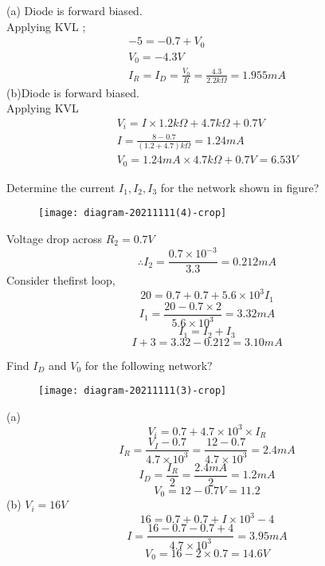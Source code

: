 \begin{enumerate}[label=\color{futuringtheme}\textbf{\arabic*.}]
\begin{minipage}{\textwidth}
\begin{figure}[H]
		\end{figure}
	\end{minipage}
	\begin{answer}
		(a) Diode is forward biased.\\
		Applying KVL ;\\
		\begin{align*}
		-5=-0.7+V_0\\
		V_0=-4.3V\\
		I_R=I_D=\frac{V_0}{R}=\frac{4.3}{2.2k\Omega}=1.955mA
		\end{align*}
		(b)Diode is forward biased.\\
		Applying KVL
		\begin{align*}
		V_i=I\times 1.2k\Omega +4.7k \Omega+0.7V\\
		I=\frac{8-0.7}{(1.2+4.7)k\Omega}=1.24mA\\
		V_0=1.24mA\times 4.7k\Omega+0.7V=6.53V
		\end{align*}
	\end{answer}
	\begin{minipage}{\textwidth}
		\item Determine the current $I_1,I_2,I_3$ for the network shown in figure?
		\begin{figure}[H]
			\centering
			\texttt{[image: diagram-20211111(4)-crop]}
			\caption{}
			\label{}
		\end{figure}
	\end{minipage}
	\begin{answer}
		Voltage drop across $R_2=0.7V$ \\
		$$\therefore I_2=\frac{0.7\times 10^{-3}}{3.3}=0.212mA$$
		Consider thefirst loop,\\
		$$20=0.7+0.7+5.6\times 10^{3}I_1$$
		$$I_1=\frac{20-0.7\times 2}{5.6\times 10^{3}}=3.32mA$$
		$$I_1=I_2+I_3$$
		$$I+3=3.32-0.212=3.10mA$$	
	\end{answer}
	\begin{minipage}{\textwidth}
		\item Find $I_D$ and $V_0$ for the following network?
		\begin{figure}[H]
			\centering
			\texttt{[image: diagram-20211111(3)-crop]}
			\caption{}
			\label{}
		\end{figure}
	\end{minipage}
	\begin{answer}
		(a)
		$$V_i=0.7+4.7\times 10^3\times I_R$$
		$$I_R=\frac{V_I-0.7}{4.7\times 10^3}=\frac{12-0.7}{4.7\times 10^3}=2.4mA$$
		$$I_D=\frac{I_R}{2}=\frac{2.4mA}{2}=1.2mA$$
		$$V_0=12-0.7V=11.2$$
		(b)
		$V_i=16V$\\
		$$16=0.7+0.7+I\times 10^3-4$$
		$$I=\frac{16-0.7-0.7+4}{4.7\times 10^3}=3.95mA$$
		$$V_0=16-2\times 0.7=14.6V$$
	\end{answer}
\end{enumerate}